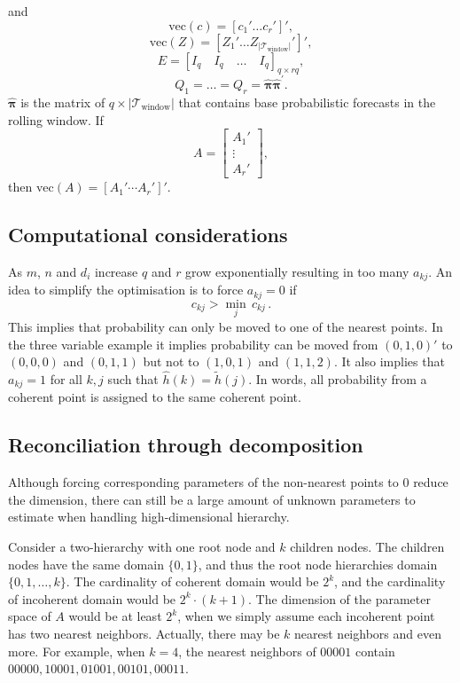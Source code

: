 \documentclass{article}
\begin{document}
    and
    \[\textrm{vec}(c) = \left[c_1' \dots c_r'\right]',\]
    \[\textrm{vec}(Z) = \left[Z_1' \dots Z_{|\mathcal{T}_{\textrm{window}}|}'\right]',\]
    \[E = [I_q \quad I_q  \quad \dots \quad I_q]_{q\times rq},\]
    \[Q_1 =\dots =Q_r = \hat{\boldsymbol{\pi}}\hat{\boldsymbol{\pi}}^\prime.\] $\hat{\boldsymbol{\pi}}$ is the matrix of $q \times |\mathcal{T}_{\textrm{window}}|$ that contains base probabilistic forecasts in the rolling window. If \[A = \left[\begin{matrix}
      A_1' \\ \vdots \\ A_r'
    \end{matrix}\right],\] then $\textrm{vec}(A) = [A_1' \cdots A_r']'$.    

    
    \subsection{Computational considerations}
    
    As $m$, $n$ and $d_i$ increase $q$ and $r$ grow exponentially resulting in too many $a_{kj}$. An idea to simplify the optimisation is to force $a_{kj}=0$ if 
    \[
     c_{kj}>\underset{j}{\min}\,c_{kj}\,.
    \]  
    This implies that probability can only be moved to one of the nearest points. In the three variable example it implies probability can be moved from $(0,1,0)'$ to $(0,0,0)$ and $(0,1,1)$ but not to $(1,0,1)$ and $(1,1,2)$. It also implies that $a_{kj}=1$ for all $k,j$ such that $\hat{h}(k)=\tilde{h}(j)$. In words, all probability from a coherent point is assigned to the same coherent point.

   \subsection{Reconciliation through decomposition}

   Although forcing corresponding parameters of the non-nearest points to 0 reduce the dimension, there can still be a large amount of unknown parameters to estimate when handling high-dimensional hierarchy. 
   
   Consider a two-hierarchy with one root node and $k$ children nodes. 
   The children nodes have the same domain $\{0, 1\}$, and thus the root node hierarchies domain $\{0, 1, \dots, k\}$.
   The cardinality of coherent domain would be $2^k$, and the cardinality of incoherent domain would be $2^k\cdot (k+1)$. 
   The dimension of the parameter space of $A$ would be at least $2^k$, when we simply assume each incoherent point has two nearest neighbors. Actually, there may be $k$ nearest neighbors and even more. For example, when $k=4$, the nearest neighbors of $00001$ contain $00000, 10001, 01001, 00101, 00011$.
\end{document}
